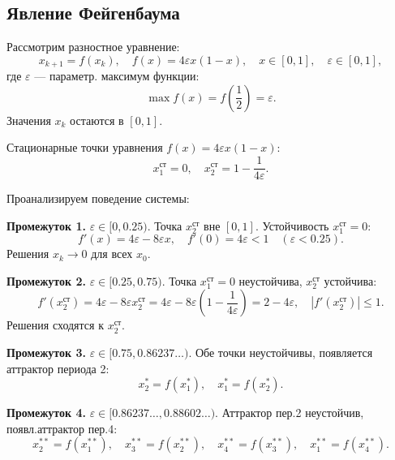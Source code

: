	\subsection{Явление Фейгенбаума}
	
	Рассмотрим разностное уравнение:
	\begin{equation}
		x_{k+1} = f(x_k), \quad f(x) = 4\varepsilon x (1 - x), \quad x \in [0,1], \quad \varepsilon \in [0,1],
	\end{equation}
	где $\varepsilon$ — параметр. максимум функции:
	\begin{equation}
		\max f(x) = f\left(\frac{1}{2}\right) = \varepsilon.
	\end{equation}
	Значения $x_k$ остаются в $[0,1]$.
	
	Стационарные точки уравнения $f(x) = 4\varepsilon x (1 - x)$:
	\begin{equation}
		x_1^{\text{ст}} = 0, \quad x_2^{\text{ст}} = 1 - \frac{1}{4\varepsilon}.
	\end{equation}
	
	\newpage
	
	Проанализируем поведение системы:
	
	\textbf{Промежуток 1.} $\varepsilon \in [0, 0.25)$. Точка $x_2^{\text{ст}}$ вне $[0,1]$. Устойчивость $x_1^{\text{ст}} = 0$:
	\begin{equation}
		f'(x) = 4\varepsilon - 8\varepsilon x, \quad f'(0) = 4\varepsilon < 1 \quad (\varepsilon < 0.25).
	\end{equation}
	Решения $x_k \to 0$ для всех $x_0$.
	
	\textbf{Промежуток 2.} $\varepsilon \in [0.25, 0.75)$. Точка $x_1^{\text{ст}} = 0$ неустойчива, $x_2^{\text{ст}}$ устойчива:
	\begin{equation}
		f'(x_2^{\text{ст}}) = 4\varepsilon - 8\varepsilon x_2^{\text{ст}} = 4\varepsilon - 8\varepsilon \left(1 - \frac{1}{4\varepsilon}\right) = 2 - 4\varepsilon, \quad |f'(x_2^{\text{ст}})| \leq 1.
	\end{equation}
	Решения сходятся к $x_2^{\text{ст}}$.
	
	\textbf{Промежуток 3.} $\varepsilon \in [0.75, 0.86237\ldots)$. Обе точки неустойчивы, появляется аттрактор периода 2:
	\begin{equation}
		x_2^* = f(x_1^*), \quad x_1^* = f(x_2^*).
	\end{equation}
	
	\textbf{Промежуток 4.} $\varepsilon \in [0.86237\ldots, 0.88602\ldots)$. Аттрактор пер.2 неустойчив, появл.аттрактор пер.4:
	\begin{equation}
		x_2^{**} = f(x_1^{**}), \quad x_3^{**} = f(x_2^{**}), \quad x_4^{**} = f(x_3^{**}), \quad x_1^{**} = f(x_4^{**}).
	\end{equation}
	
